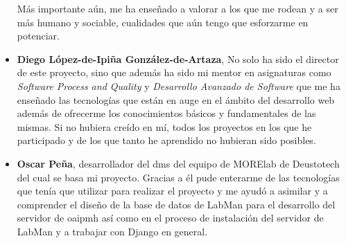 \begin{itemize}
	Más importante aún, me ha enseñado a valorar a los que me rodean y a ser más humano y sociable, cualidades que aún tengo que esforzarme en potenciar.

	\item \textbf{Diego López-de-Ipiña González-de-Artaza}, No solo ha sido el director de este proyecto, sino que además ha sido mi mentor en asignaturas como \textit{Software Process and Quality} y \textit{Desarrollo Avanzado de Software} que me ha enseñado las tecnologías que están en auge en el ámbito del desarrollo web además de ofrecerme los conocimientos básicos y fundamentales de las mismas. Si no hubiera creído en mí, todos los proyectos en los que he participado y de los que tanto he aprendido no hubieran sido posibles.

	\item \textbf{Oscar Peña}, desarrollador del \acrshort{dms} del equipo de MORElab de Deustotech del cual se basa mi proyecto. Gracias a él pude enterarme de las tecnologías que tenía que utilizar para realizar el proyecto y me ayudó a asimilar y a comprender el diseño de la base de datos de LabMan para el desarrollo del servidor de \acrshort{oaipmh} así como en el proceso de instalación del servidor de LabMan y a trabajar con Django en general.

\end{itemize}